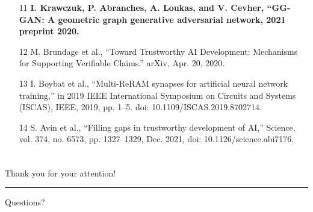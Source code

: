 \documentclass[./presentation.tex]{subfiles}
\begin{document}
\begin{frame}[label=done]
\begin{columns}
\begin{column}{0.5\textwidth}
{\begin{enumerate}
        \item [11] \textbf{I. Krawczuk, P. Abranches, A. Loukas, and V. Cevher, “GG-GAN: A geometric graph generative adversarial network, 2021 preprint 2020.} 
      \item [12] M. Brundage et al., “Toward Trustworthy AI Development: Mechanisms for Supporting Verifiable Claims.” arXiv, Apr. 20, 2020. 
      \item [13] I. Boybat et al., “Multi-ReRAM synapses for artificial neural network training,” in 2019 IEEE International Symposium on Circuits and Systems (ISCAS), IEEE, 2019, pp. 1–5. doi: 10.1109/ISCAS.2019.8702714.
      \item [14] S. Avin et al., “Filling gaps in trustworthy development of AI,” Science, vol. 374, no. 6573, pp. 1327–1329, Dec. 2021, doi: 10.1126/science.abi7176.
    \end{enumerate}
  }
    \end{column}
  \end{columns}
\end{frame}
\begin{frame}[c,label=concfin]
  \frametitle{}
  \centering
  \Huge
  \strut
 Thank you for your attention!
 \par\noindent\rule{0.8\textwidth}{0.4pt}
 Questions?
\end{frame}
\end{document}
